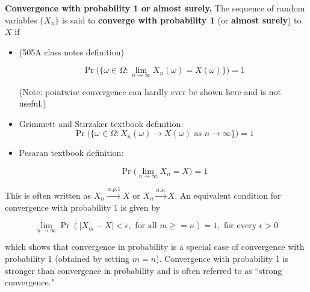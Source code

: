 \begin{definition}
\textbf{Convergence with probability 1 or almost surely.} The sequence of random variables \(\{X_n\}\) is said to \textbf{converge with probability 1} (or \textbf{almost surely}) to \(X\) if 

\begin{itemize}

\item (505A class notes definition)

\[
\Pr\big( \{\omega \in \Omega: \lim_{n \to \infty} X_n(\omega) = X(\omega) \} \big) = 1
\]

(Note: pointwise convergence can hardly ever be shown here and is not useful.)

\item Grimmett and Stirzaker textbook definition:
\[
\Pr \big( \{\omega \in \Omega: X_n(\omega) \to X(\omega) \text{ as } n \to \infty \} \big) = 1
\]

\item Pesaran textbook definition:

\[
\Pr \bigg( \lim_{n \to \infty} X_n = X \bigg) = 1
\]

\end{itemize}

\begin{remark}This is often written as \(X_n \xrightarrow{w.p.1} X\) or \(X_n \xrightarrow{a.s.} X\). An equivalent condition for convergence with probability 1 is given by

\[
\lim_{n \to \infty} \Pr( |X_m - X| < \epsilon, \text{ for all } m \geq =n) = 1, \text{ for every } \epsilon > 0
\]

which shows that convergence in probability is a special case of convergence with probability 1 (obtained by setting \(m = n\)). Convergence with probability 1 is stronger than convergence in probability and is often referred to as ``strong convergence." \end{remark}

\end{definition}

